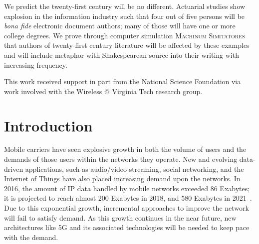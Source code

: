 \documentclass[12pt,dvipsnames]{report}
\begin{document}
We predict the twenty-first century will be no different.  Actuarial
studies show explosion in the information industry such that four out
of five persons will be \textit{bona fide} electronic document
authors; many of those will have one or more college degrees.  We
prove through computer simulation \textsc{Machinum Simitatores} that
authors of twenty-first century literature will be affected by these
examples and will include metaphor with Shakespearean source into
their writing with increasing frequency.
\fi

\vfill


This work received support in part from the National Science Foundation via work involved with the Wireless @ Virginia Tech research group.

\pagebreak


\tableofcontents
\pagebreak

\listoffigures
\pagebreak

\listoftables
\pagebreak

\pagestyle{myheadings}

\iftrue
\chapter{Introduction} \label{ch:intro}

Mobile carriers have seen explosive growth in both the volume of users and the demands of those users within the networks they operate.  New and evolving data-driven applications, such as audio/video streaming, social networking, and the Internet of Things have also placed increasing demand upon the networks.  In 2016, the amount of IP data handled by mobile networks exceeded 86 Exabytes; it is projected to reach almost 200 Exabytes in 2018, and 580 Exabytes in 2021~\cite{ciscoVNI2017}.  Due to this exponential growth, incremental approaches to improve the network will fail to satisfy demand.  As this growth continues in the near future, new architectures like 5G and its associated technologies will be needed to keep pace with the demand.
\end{document}
